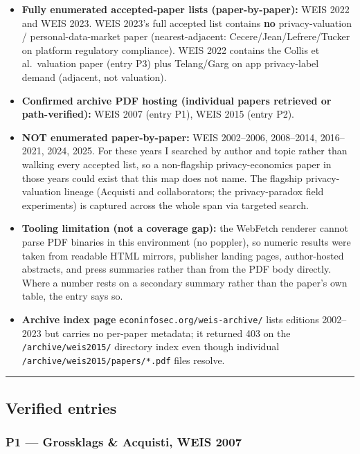 \documentclass[
  11pt,
]{article}
\providecommand{\tightlist}{%
  \setlength{\itemsep}{0pt}\setlength{\parskip}{0pt}}
\begin{document}
\begin{itemize}
\tightlist
\item
  \textbf{Fully enumerated accepted-paper lists (paper-by-paper):} WEIS
  2022 and WEIS 2023. WEIS 2023's full accepted list contains
  \textbf{no} privacy-valuation / personal-data-market paper
  (nearest-adjacent: Cecere/Jean/Lefrere/Tucker on platform regulatory
  compliance). WEIS 2022 contains the Collis et al.~valuation paper
  (entry P3) plus Telang/Garg on app privacy-label demand (adjacent, not
  valuation).
\item
  \textbf{Confirmed archive PDF hosting (individual papers retrieved or
  path-verified):} WEIS 2007 (entry P1), WEIS 2015 (entry P2).
\item
  \textbf{NOT enumerated paper-by-paper:} WEIS 2002--2006, 2008--2014,
  2016--2021, 2024, 2025. For these years I searched by author and topic
  rather than walking every accepted list, so a non-flagship
  privacy-economics paper in those years could exist that this map does
  not name. The flagship privacy-valuation lineage (Acquisti and
  collaborators; the privacy-paradox field experiments) is captured
  across the whole span via targeted search.
\item
  \textbf{Tooling limitation (not a coverage gap):} the WebFetch
  renderer cannot parse PDF binaries in this environment (no poppler),
  so numeric results were taken from readable HTML mirrors, publisher
  landing pages, author-hosted abstracts, and press summaries rather
  than from the PDF body directly. Where a number rests on a secondary
  summary rather than the paper's own table, the entry says so.
\item
  \textbf{Archive index page} \texttt{econinfosec.org/weis-archive/}
  lists editions 2002--2023 but carries no per-paper metadata; it
  returned 403 on the \texttt{/archive/weis2015/} directory index even
  though individual \texttt{/archive/weis2015/papers/*.pdf} files
  resolve.
\end{itemize}

\begin{center}\rule{0.5\linewidth}{0.5pt}\end{center}

\subsection{Verified entries}\label{verified-entries}

\subsubsection{P1 --- Grossklags \& Acquisti, WEIS
2007}\label{p1-grossklags-acquisti-weis-2007}
\end{document}
